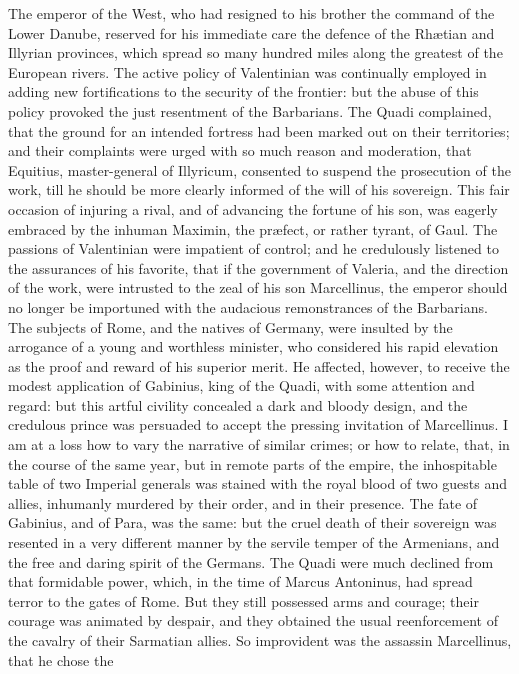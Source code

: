 The emperor of the West, who had resigned to his brother the
command of the Lower Danube, reserved for his immediate care the
defence of the Rhætian and Illyrian provinces, which spread so
many hundred miles along the greatest of the European rivers. The
active policy of Valentinian was continually employed in adding
new fortifications to the security of the frontier: but the abuse
of this policy provoked the just resentment of the Barbarians.
The Quadi complained, that the ground for an intended fortress
had been marked out on their territories; and their complaints
were urged with so much reason and moderation, that Equitius,
master-general of Illyricum, consented to suspend the prosecution
of the work, till he should be more clearly informed of the will
of his sovereign. This fair occasion of injuring a rival, and of
advancing the fortune of his son, was eagerly embraced by the
inhuman Maximin, the præfect, or rather tyrant, of Gaul. The
passions of Valentinian were impatient of control; and he
credulously listened to the assurances of his favorite, that if
the government of Valeria, and the direction of the work, were
intrusted to the zeal of his son Marcellinus, the emperor should
no longer be importuned with the audacious remonstrances of the
Barbarians. The subjects of Rome, and the natives of Germany,
were insulted by the arrogance of a young and worthless minister,
who considered his rapid elevation as the proof and reward of his
superior merit. He affected, however, to receive the modest
application of Gabinius, king of the Quadi, with some attention
and regard: but this artful civility concealed a dark and bloody
design, and the credulous prince was persuaded to accept the
pressing invitation of Marcellinus. I am at a loss how to vary
the narrative of similar crimes; or how to relate, that, in the
course of the same year, but in remote parts of the empire, the
inhospitable table of two Imperial generals was stained with the
royal blood of two guests and allies, inhumanly murdered by their
order, and in their presence. The fate of Gabinius, and of Para,
was the same: but the cruel death of their sovereign was resented
in a very different manner by the servile temper of the
Armenians, and the free and daring spirit of the Germans. The
Quadi were much declined from that formidable power, which, in
the time of Marcus Antoninus, had spread terror to the gates of
Rome. But they still possessed arms and courage; their courage
was animated by despair, and they obtained the usual
reenforcement of the cavalry of their Sarmatian allies. So
improvident was the assassin Marcellinus, that he chose the

